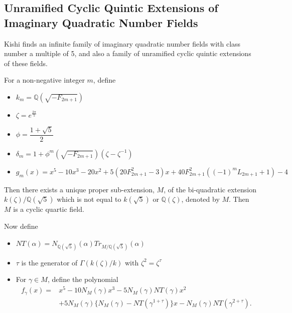 \documentclass[12pt]{extarticle}
\newcommand{\Q}{\mathbb{Q}}
\newcommand{\<}{\langle}
\renewcommand{\>}{\rangle}
\theoremstyle{definition}
\begin{document}
\subsection{Unramified Cyclic Quintic Extensions of Imaginary Quadratic Number Fields}


Kishi \cite{KISH} finds an infinite family of imaginary quadratic number fields with class number a multiple of 5, and also a family of unramified cyclic quintic extensions of these fields. 

 For a non-negative integer $m$, define 
\begin{itemize}
\item $k_m = \Q(\sqrt{-F_{2m+1}})$ 
\item $\zeta = e^{\frac{2\pi}{5}}$  
\item $\phi = \dfrac{1+\sqrt{5}}{2}$
\item $\delta_m = 1+\phi^m(\sqrt{-F_{2m+1}})(\zeta-\zeta^{-1})$
\item $ g_m(x) = x^5 - 10x^3  -20x^2 + 
    5(20F^2_{2m+1} - 3)x
    + 40F^2_{2m+1}((-1)^{m}L_{2m+1} + 1)- 4$
\end{itemize}

Then there exists a unique proper sub-extension, $M$, of the bi-quadratic
extension \\ $k(\zeta)/\Q(\sqrt{5})$ which is not equal to 
$k(\sqrt{5})$ or $\Q(\zeta)$, denoted by $M$. Then $M$ is a cyclic quartic field. \par 
Now define 
\begin{itemize}
\item $NT(\alpha) = N_{\Q(\sqrt{5})}(\alpha)Tr_{M/\Q(\sqrt{5})}(\alpha)$
\item $\tau$ is the generator of $\Gamma(k(\zeta)/k)$ with $\zeta^2=\zeta^\tau$
\item For $\gamma \in M$, define the polynomial 
\begin{equation}
\begin{split}
    f_\gamma(x) = {} & x^5 - 10N_M(\gamma)x^3  -5N_M(\gamma)NT (\gamma)x^2 \\ &
  + 5N_M(\gamma)\{N_M(\gamma) 
  - NT(\gamma^{1+\tau})\}x 
  - N_M(\gamma)NT(\gamma^{2+\tau}) .
  \end{split}
\end{equation}
\end{itemize}
\end{document}
